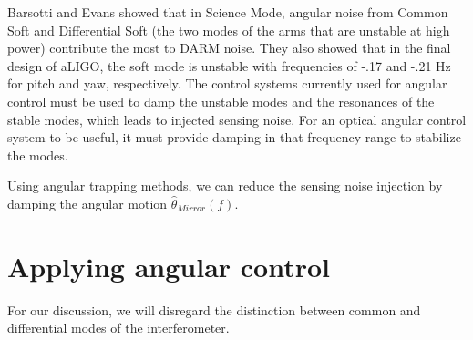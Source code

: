 Barsotti and Evans showed that in Science Mode, angular noise from Common Soft and Differential Soft (the two modes of the arms that are unstable at high power) contribute the most to DARM noise. They also showed that in the final design of aLIGO, the soft mode is unstable with frequencies of -.17 and -.21 Hz for pitch and yaw, respectively. The control systems currently used for angular control must be used to damp the unstable modes and the resonances of the stable modes, which leads to injected sensing noise. For an optical angular control system to be useful, it must provide damping in that frequency range to stabilize the modes.

Using angular trapping methods, we can reduce the sensing noise injection by damping the angular motion $\hat{\theta}_{Mirror}(f)$.

\section{Applying angular control}

For our discussion, we will disregard the distinction between common and differential modes of the interferometer.

